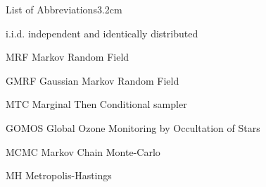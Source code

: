 \begin{mclistof}{List of Abbreviations}{3.2cm}

\item[i.i.d.]  independent and identically distributed

\item[MRF] Markov Random Field

\item[GMRF] Gaussian Markov Random Field

\item[MTC] Marginal Then Conditional sampler

\item[GOMOS] Global Ozone Monitoring by Occultation of Stars

\item[MCMC] Markov Chain Monte-Carlo

\item[MH] Metropolis-Hastings
\end{mclistof} 

%	
%	
%	
%	
%	
%	
%	
%
%
%
%
%
%
